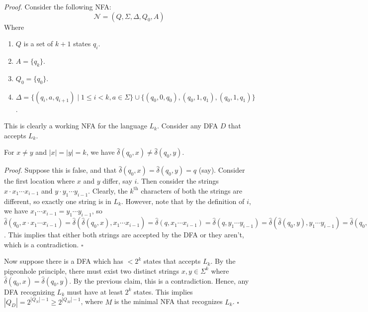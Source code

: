 \documentclass[a4paper]{article}
\newenvironment{proof}{\begin{breakbox}\textit{Proof.}}{\hfill$\square$\end{breakbox}}
\newcommand{\nl}{\vspace{0.2cm}\\}
\newcommand{\mc}{\mathcal}
\newcommand{\hd}{\hat{\delta}}
\begin{document}
\begin{proof}
    Consider the following NFA:
    $$\mc{N} = (Q, \Sigma, \Delta, Q_0, A)$$
    Where 
    \begin{enumerate}
        \item $Q$ is a set of $k + 1$ states $q_i$.
        \item $A = \{q_k\}$.
        \item $Q_0 = \{q_0\}$.
        \item $\Delta = \{(q_i, a, q_{i+1}) \mid 1 \le i < k, a \in \Sigma\} \cup \{(q_0, 0, q_0), (q_0, 1, q_1), (q_0, 1, q_1)\}$.
    \end{enumerate}
    This is clearly a working NFA for the language $L_k$. Consider any DFA $D$ that accepts $L_k$.\nl
    \begin{claim}
        For $x \ne y$ and $|x| = |y| = k$, we have $\hd(q_0, x) \ne \hd(q_0, y)$.
    \end{claim}
    \begin{proof}
        Suppose this is false, and that $\hd(q_0, x) = \hd(q_0, y) = q$ (say).
        Consider the first location where $x$ and $y$ differ, say $i$. Then consider the strings $x \cdot x_1 \cdots x_{i - 1}$ and $y \cdot y_1 \cdots y_{i - 1}$. Clearly, the
        $k^\mathrm{th}$ characters of both the strings are different, so exactly one string is in $L_k$. However, note that by the definition of $i$, we have $x_1 \cdots x_{i-1} = y_1 \cdots
        y_{i-1}$, so $\hd(q_0, x \cdot x_1 \cdots x_{i-1}) = \hd(\hd(q_0, x), x_1 \cdots x_{i-1}) = \hd(q, x_1 \cdots x_{i-1}) = \hd(q, y_1 \cdots y_{i-1}) = \hd(\hd(q_0, y), y_1 \cdots y_{i-1})
        = \hd(q_0, y \cdot y_1 \cdots y_{i-1})$. This implies that either both strings are accepted by the DFA or they aren't, which is a contradiction.
    \end{proof}
    Now suppose there is a DFA which has $< 2^k$ states that accepts $L_k$. By the pigeonhole principle, there must exist two distinct strings $x, y \in \Sigma^k$ where $\hd(q_0, x) = \hd(q_0,
    y)$. By the previous claim, this is a contradiction. Hence, any DFA recognizing $L_k$ must have at least $2^k$ states. This implies $|Q_D| = 2^{|Q_N| - 1} \ge 2^{|Q_M| - 1}$, where $M$ is the
    minimal NFA that recognizes $L_k$.
\end{proof}
\end{document}
